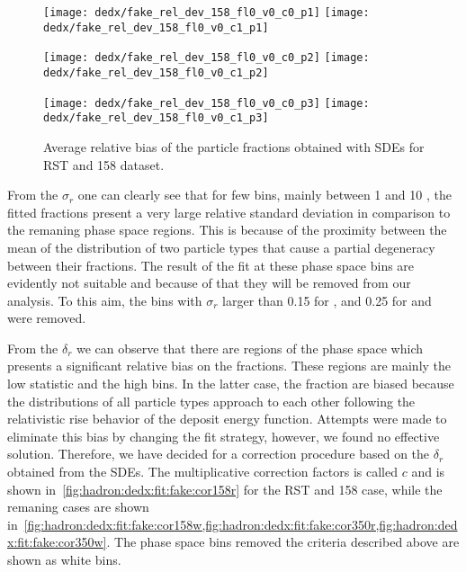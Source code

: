 \begin{figure}[!ht]
  \centering
  \texttt{[image: dedx/fake\_rel\_dev\_158\_fl0\_v0\_c0\_p1]}
  \texttt{[image: dedx/fake\_rel\_dev\_158\_fl0\_v0\_c1\_p1]}

  \texttt{[image: dedx/fake\_rel\_dev\_158\_fl0\_v0\_c0\_p2]}
  \texttt{[image: dedx/fake\_rel\_dev\_158\_fl0\_v0\_c1\_p2]}

  \texttt{[image: dedx/fake\_rel\_dev\_158\_fl0\_v0\_c0\_p3]}
  \texttt{[image: dedx/fake\_rel\_dev\_158\_fl0\_v0\_c1\_p3]}


  \caption{Average relative bias of the particle fractions obtained with SDEs for RST and 158 \GeVc dataset.}
  \label{fig:hadron:dedx:fit:fake:reldev158r}
\end{figure}

From the $\sigma_r$ one can clearly see
that for few \pp bins, mainly between 1 and 10 \GeVc,
the fitted fractions present a very large relative
standard deviation in comparison to the remaning phase space regions.
This is because of the proximity between the mean of the
\dedx distribution of two particle types that cause
a partial degeneracy between their fractions. The result
of the \dedx fit at these phase space bins are evidently not
suitable and because of that they will be removed from our analysis.
To this aim, the bins with $\sigma_r$ larger than 0.15 for \pions,
and 0.25 for \kaons and \protons were removed. 

From the $\delta_r$ we can observe that there are regions
of the phase space which presents a significant relative
bias on the fractions.
These regions are mainly the low statistic and the high \pp
bins. In the latter case, the fraction are biased because
the \dedx distributions of all particle types
approach to each other following the relativistic rise
behavior of the deposit energy function.
Attempts were made to eliminate this bias
by changing the fit strategy, however, we found no effective solution.
Therefore, we have decided for a correction procedure based on
the $\delta_r$ obtained from the SDEs.
The multiplicative correction factors is called $c$ and is shown
in~\cref{fig:hadron:dedx:fit:fake:cor158r} for the RST and 158 \GeVc case,
while the remaning cases are shown
in~\cref{fig:hadron:dedx:fit:fake:cor158w,fig:hadron:dedx:fit:fake:cor350r,fig:hadron:dedx:fit:fake:cor350w}.
The phase space bins removed the criteria described above are shown
as white bins.

